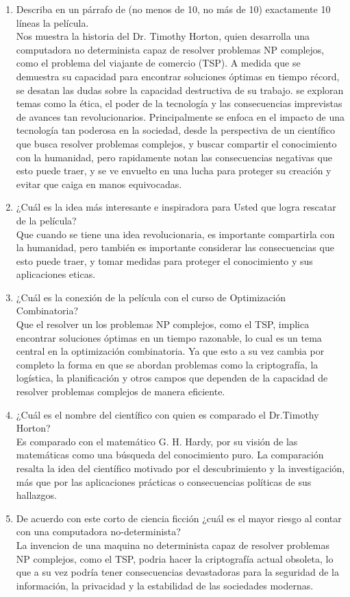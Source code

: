 
\begin{enumerate}
    \item Describa en un párrafo de (no menos de 10, no más de 10) exactamente 10 líneas la película.\\
    Nos muestra la historia del Dr. Timothy Horton, quien desarrolla una computadora no determinista capaz de resolver problemas 
    NP complejos, como el problema del viajante de comercio (TSP). A medida que se demuestra su capacidad 
    para encontrar soluciones óptimas en tiempo récord, se desatan las dudas sobre la capacidad destructiva de su trabajo. 
    se exploran temas como la ética, el poder de la tecnología y las consecuencias imprevistas de avances 
    tan revolucionarios. Principalmente se enfoca en el impacto de una tecnología tan poderosa en la sociedad, desde 
    la perspectiva de un científico que busca resolver problemas complejos, y buscar compartir el conocimiento con la humanidad, 
    pero rapidamente notan las consecuencias negativas que esto puede traer, y se ve envuelto en una lucha para proteger su creación y evitar que caiga en manos equivocadas.

    \item ¿Cuál es la idea más interesante e inspiradora para Usted que logra rescatar de la película? \\
    Que cuando se tiene una idea revolucionaria, es importante compartirla con la humanidad, pero también 
    es importante considerar las consecuencias que esto puede traer, y tomar medidas para proteger el conocimiento 
    y sus aplicaciones eticas.

    \item ¿Cuál es la conexión de la película con el curso de Optimización Combinatoria?
    \\
    Que el resolver un los problemas NP complejos, como el TSP, implica encontrar soluciones óptimas en un tiempo razonable, 
    lo cual es un tema central en la optimización combinatoria. Ya que esto a su vez cambia por completo la forma en que se 
    abordan problemas como la criptografía, la logística, la planificación y otros campos que dependen de la capacidad de resolver 
    problemas complejos de manera eficiente.
    \item ¿Cuál es el nombre del científico con quien es comparado el Dr.Timothy Horton?
    \\
    Es comparado con el matemático G. H. Hardy, por su visión de las matemáticas 
    como una búsqueda del conocimiento puro. La comparación resalta la idea del científico motivado por el descubrimiento y la 
    investigación, más que por las aplicaciones prácticas o consecuencias políticas de sus hallazgos.
    \item De acuerdo con este corto de ciencia ficción ¿cuál es el mayor riesgo al contar con una computadora no-determinista?
    \\
    La invencion de una maquina no determinista capaz de resolver problemas NP complejos, como el TSP, podria hacer la criptografía actual obsoleta,
    lo que a su vez podría tener consecuencias devastadoras para la seguridad de la información, la privacidad y la estabilidad de las sociedades modernas.
\end{enumerate}